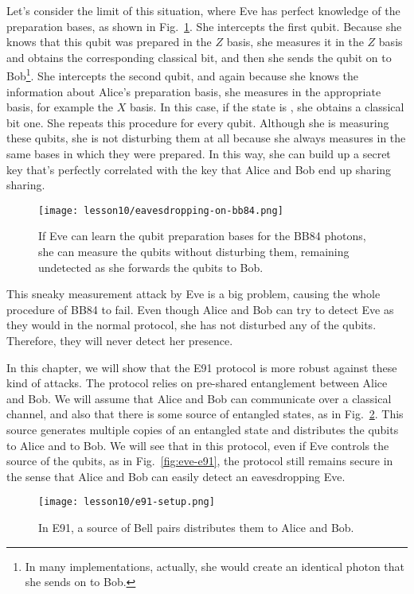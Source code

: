 Let's consider the limit of this situation, where Eve has perfect knowledge of the preparation bases, as shown in Fig.~\ref{fig:eve-bb84}.
She intercepts the first qubit.
Because she knows that this qubit was prepared in the $Z$ basis, she measures it in the $Z$ basis and obtains the corresponding classical bit, and then she sends the qubit on to Bob\footnote{In many implementations, actually, she would create an identical photon that she sends on to Bob.}.
She intercepts the second qubit, and again because she knows the information about Alice's preparation basis, she measures in the appropriate basis, for example the $X$ basis.
In this case, if the state is \ket{-}, she obtains a classical bit one. She repeats this procedure for every qubit.
Although she is measuring these qubits, she is not disturbing them at all because she always measures in the same bases in which they were prepared.
In this way, she can build up a secret key that's perfectly correlated with the key that Alice and Bob end up sharing sharing.
\begin{figure}[t]
    \centering
    \texttt{[image: lesson10/eavesdropping-on-bb84.png]}
        \caption[Successful eavesdropping on BB84]{If Eve can learn the qubit preparation bases for the BB84 photons, she can measure the qubits without disturbing them, remaining undetected as she forwards the qubits to Bob.}
    \label{fig:eve-bb84}
\end{figure}
This sneaky measurement attack by Eve is a big problem, causing the whole procedure of BB84 to fail.
Even though Alice and Bob can try to detect Eve as they would in the normal protocol, she has not disturbed any of the qubits.
Therefore, they will never detect her presence.

In this chapter, we will show that the E91 protocol is more robust against these kind of attacks.
The protocol relies on pre-shared entanglement between Alice and Bob.
We will assume that Alice and Bob can communicate over a classical channel, and also that there is some source of entangled states, as in Fig.~\ref{fig:e91-setup}.
This source generates multiple copies of an entangled state and distributes the qubits to Alice and to Bob.
We will see that in this protocol, even if Eve controls the source of the qubits, as in Fig.~\ref{fig:eve-e91}, the protocol still remains secure in the sense that Alice and Bob can easily detect an eavesdropping Eve.

\begin{figure}[H]
    \centering
    \texttt{[image: lesson10/e91-setup.png]}
        \caption[E91 setup]{In E91, a source of Bell pairs distributes them to Alice and Bob.}
    \label{fig:e91-setup}
\end{figure}

